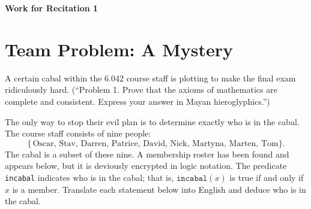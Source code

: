 \documentclass[11pt,fleqn]{article}
\begin{document}
\thispagestyle{firstpage}

\vspace*{0cm} %

\begin{center}
  \Large \textbf{Work for Recitation 1}
\end{center}

\vspace{1cm} %

\section{Team Problem: A Mystery}

A certain cabal within the 6.042 course staff is plotting to make the final exam ridiculously hard. (``Problem 1. Prove that the axioms of mathematics are complete and consistent. Express your answer in Mayan hieroglyphics.'')

The only way to stop their evil plan is to determine exactly who is in the cabal. The course staff consists of nine people:
\[
\{\,\text{Oscar},\, \text{Stav},\, \text{Darren},\, \text{Patrice},\, \text{David},\, \text{Nick},\, \text{Martyna},\, \text{Marten},\, \text{Tom}\}.
\]
The cabal is a subset of these nine. A membership roster has been found and appears below, but it is deviously encrypted in logic notation. The predicate \texttt{incabal} indicates who is in the cabal; that is, \(\texttt{incabal}(x)\) is true if and only if \(x\) is a member. Translate each statement below into English and deduce who is in the cabal.
\end{document}
